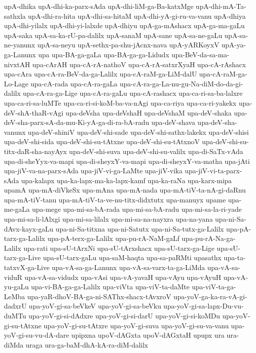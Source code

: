 {upA-dhika
upA-dhi-ka-parx-sAda
upA-dhi-liM-ga-Ba-katxMge
upA-dhi-mA-Ta-sathxla
upA-dhi-ra-hita
upA-dhi-sa-hitaM
upA-dhi-yA-gi-ru-va-vanu
upA-dhiya
upA-dhi-yilalx
upA-dhi-yi-lalxde
upA-dhiyu
upA-ga-mAshacx
upA-ga-ma-gaLu
upA-saka
upA-sa-ka-rU-pa-dalilx
upA-sanaM
upA-sane
upA-sa-ne-gaLu
upA-sa-ne-yanunx
upA-sa-neyu
upA-sethx-pa-shu-jAcnx-nava
upA-yARKoyxV
upA-ya-ga-Lanunx
upa
upa-BA-ga-gaLa
upa-BA-ga-ga-Lidudx
upa-BeV-da-sa-ma-nivxtAH
upa-cArAH
upa-cA-rA-nathoV
upa-cA-rA-satxrXyaH
upa-cA-rAshacx
upa-cAra
upa-cA-ra-BeV-da-ga-Lalilx
upa-cA-raM-ga-LiM-dalU
upa-cA-raM-ga-Lo-Lage
upa-cA-rada
upa-cA-ra-gaLa
upa-cA-ra-ga-La-nu-gu-Na-diM-do-da-gi-dalilx
upa-cA-ra-ga-Lige
upa-cA-ra-gaLu
upa-cA-rashacx
upa-ca-ri-sa-ba-lalxre
upa-ca-ri-sa-luMTe
upa-ca-ri-si-koM-ba-va-nAgi
upa-ca-riya
upa-ca-ri-yakekx
upa-deV-shA-thaR-vAgi
upa-deVsha
upa-deVshaH
upa-deVshaM
upa-deV-shaka
upa-deV-sha-parx-sA-da-mu-Ki-yA-ga-di-ra-bA-radu
upa-deV-shava
upa-deV-sha-vanunx
upa-deV-shiniV
upa-deV-shi-sade
upa-deV-shi-sathx-lakekx
upa-deV-shisi
upa-deV-shi-sida
upa-deV-shi-su-tAtxne
upa-deV-shi-su-tAtxnoV
upa-deV-shi-su-titx-daR-sha-nayAyx
upa-deV-shi-suva
upa-deV-shi-su-valilx
upa-di-SaTx-vAda
upa-di-sheYyx-va-mapi
upa-di-sheyxY-va-mapi
upa-di-sheyxY-va-matha
upa-jAti
upa-jiV-va-na-parx-sAda
upa-jiV-vi-ga-LaMte
upa-jiV-vika
upa-jiV-vi-ta-parx-sAda
upa-kalapx
upa-ka-lapx-ma-ka-lapx-kamf
upa-ka-raNa
upa-karx-mipa
upamA
upa-mA-diVkeSx
upa-mAna
upa-mA-nada
upa-mA-tiV-ta-nA-gi-daRnu
upa-mA-tiV-tanu
upa-mA-tiV-ta-ve-nu-titx-didxtutx
upa-manuyx
upame
upa-me-gaLa
upa-mege
upa-mi-sa-bA-rada
upa-mi-sa-bA-radu
upa-mi-sa-la-ri-yade
upa-mi-sa-li-lAlxgi
upa-mi-sa-lilalx
upa-mi-sa-na-nayxra
upa-na-yana
upa-ni-Sa-dAvx-kayx-gaLu
upa-ni-Sa-titxna
upa-ni-Satutx
upa-ni-Sa-tutx-ga-Lalilx
upa-pA-tarx-ga-Lalilx
upa-pA-terx-ga-Lalilx
upa-pu-rA-NaM-gaLf
upa-pu-rA-Na-ga-Lalilx
upa-rati
upa-sU-tArxNi
upa-sU-tArxshacx
upa-sU-tarx-ga-Lige
upa-sU-tarx-ga-Live
upa-sU-tarx-gaLu
upa-saM-haqta
upa-sa-paRMti
upasathx
upa-ta-tatxvX-ga-Live
upa-vA-sa-ga-Lanunx
upa-vA-sa-varx-ta-ga-LiMda
upa-vA-sa-viduR
upa-vA-sa-vidudx
upa-vAsi
upa-vA-yavaH
upa-vAyu
upa-vAyuH
upa-vA-yu-gaLu
upa-vi-BA-ga-ga-Lalilx
upa-viVta
upa-viV-ta-daMte
upa-viV-ta-ga-LeMba
upa-yaR-dhoV-BA-ga-ni-SAThx-shacx-tAvxroV
upa-yoV-ga-ka-ra-vA-gi-dadxrU
upa-yoV-gi-sa-beVkeV
upa-yoV-gi-sa-beVku
upa-yoV-gi-sa-lapx-Du-vu-duMTu
upa-yoV-gi-si-dAdxre
upa-yoV-gi-si-darU
upa-yoV-gi-si-koMDu
upa-yoV-gi-su-tAtxne
upa-yoV-gi-su-tAtxre
upa-yoV-gi-suva
upa-yoV-gi-su-va-vanu
upa-yoV-gi-su-vu-dA-dare
upipxna
upoV-dAGxta
upoV-dAGxtaH
upupx
ura
ura-diMda
uraga
ura-ga-baM-dhA-kA-ra-diM-dalilx
}
